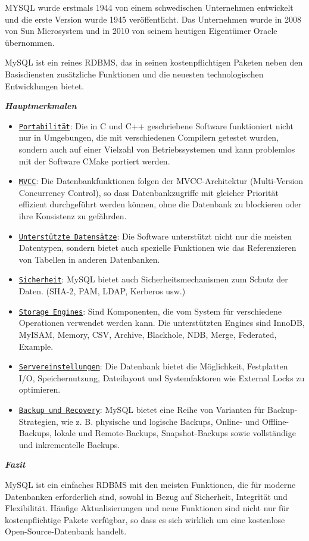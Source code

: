 MYSQL wurde erstmals 1944 von einem schwedischen Unternehmen entwickelt und die erste Version
wurde 1945 veröffentlicht. Das Unternehmen wurde in 2008 von Sun Microsystem und in 2010 von seinem
heutigen Eigentümer Oracle übernommen.

MySQL ist ein reines RDBMS, das in seinen kostenpflichtigen Paketen neben den Basisdiensten 
zusätzliche Funktionen und die neuesten technologischen Entwicklungen bietet. 

\begin{large} \emph{\textbf{Hauptmerkmalen}} \end{large}
\begin{itemize}
    \item \underline{\texttt{Portabilität}}:
        Die in C und C++ geschriebene Software funktioniert nicht nur in Umgebungen,
        die mit verschiedenen Compilern getestet wurden, sondern auch auf einer Vielzahl 
        von Betriebssystemen und kann problemlos mit der Software CMake portiert werden.
    \item \underline{\texttt{MVCC}}:
        Die Datenbankfunktionen folgen der MVCC-Architektur (Multi-Version Concurrency Control),
        so dass Datenbankzugriffe mit gleicher Priorität effizient durchgeführt werden können, 
        ohne die Datenbank zu blockieren oder ihre Konsistenz zu gefährden.
    \item \underline{\texttt{Unterstützte Datensätze}}:
        Die Software unterstützt nicht nur die meisten Datentypen, sondern bietet auch spezielle 
        Funktionen wie das Referenzieren von Tabellen in anderen Datenbanken.
    \item \underline{\texttt{Sicherheit}}:
        MySQL bietet auch Sicherheitsmechanismen zum Schutz der Daten. 
        (SHA-2, PAM, LDAP, Kerberos usw.) 
    \item \underline{\texttt{Storage Engines}}:
        Sind Komponenten, die vom System für verschiedene Operationen verwendet werden kann.
        Die unterstützten Engines sind InnoDB, MyISAM, Memory, CSV, Archive, Blackhole, NDB,
        Merge, Federated, Example. 
    \item \underline{\texttt{Servereinstellungen}}:
        Die Datenbank bietet die Möglichkeit, Festplatten I/O, Speichernutzung, Dateilayout und 
        Systemfaktoren wie External Locks zu optimieren. 
    \item \underline{\texttt{Backup und Recovery}}:
        MySQL bietet eine Reihe von Varianten für Backup-Strategien, wie z. B. physische und logische
        Backups, Online- und Offline-Backups, lokale und Remote-Backups, Snapshot-Backups sowie
        vollständige und inkrementelle Backups.
\end{itemize} 
\begin{large} \emph{\textbf{Fazit}} \end{large}
MySQL ist ein einfaches RDBMS mit den meisten Funktionen, die für moderne Datenbanken erforderlich 
sind, sowohl in Bezug auf Sicherheit, Integrität und Flexibilität. Häufige Aktualisierungen und neue
Funktionen sind nicht nur für kostenpflichtige Pakete verfügbar, so dass es sich wirklich um eine
kostenlose Open-Source-Datenbank handelt. 